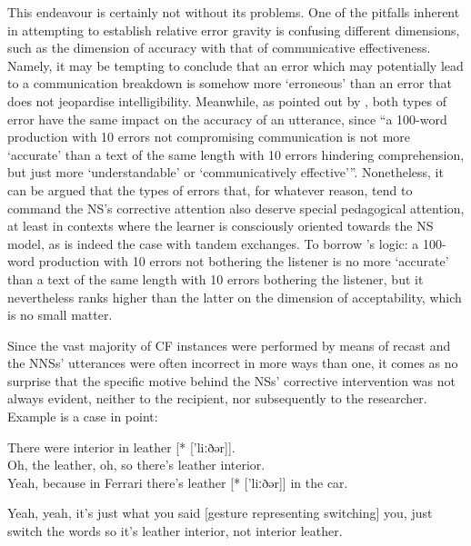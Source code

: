 \documentclass[output=paper,colorlinks,citecolor=brown,modfonts,nonflat]{../langscibook}
\begin{document}
This endeavour is certainly not without its problems. One of the pitfalls inherent in attempting to establish relative error gravity is confusing different dimensions, such as the dimension of accuracy with that of communicative effectiveness. Namely, it may be tempting to conclude that an error which may potentially lead to a communication breakdown is somehow more ‘erroneous’ than an error that does not jeopardise intelligibility. Meanwhile, as pointed out by \citet[592]{Pallotti2009}, both types of error have the same impact on the accuracy of an utterance, since “a 100-word production with 10 errors not compromising communication is not more ‘accurate’ than a text of the same length with 10 errors hindering comprehension, but just more ‘understandable’ or ‘communicatively effective’”. Nonetheless, it can be argued that the types of errors that, for whatever reason, tend to command the NS’s corrective attention also deserve special pedagogical attention, at least in contexts where the learner is consciously oriented towards the NS model, as is indeed the case with tandem exchanges. To borrow \citeauthor{Pallotti2009}’s logic: a 100-word production with 10 errors not bothering the listener is no more ‘accurate’ than a text of the same length with 10 errors bothering the listener, but it nevertheless ranks higher than the latter on the dimension of acceptability, which is no small matter.



Since the vast majority of CF instances were performed by means of recast and the NNSs’ utterances were often incorrect in more ways than one, it comes as no surprise that the specific motive behind the NSs’ corrective intervention was not always evident, neither to the recipient, nor subsequently to the researcher. Example  is a case in point: 


\ea\label{ex:scheuer:11}
{\NNS} {There} {were} {interior} {in} {leather} [* ['liːðər]].\\
{\NS} {Oh,} {the} {leather,} {oh,} {so} {there’s} {leather} {interior.}\\
{\NNS} {Yeah,} {because} {in} {Ferrari} {there’s} {leather} [* ['liːðər]] {in} {the} {car.}\\
{\NS} \parbox[t]{9cm}{{Yeah,} {yeah,} {it’s} {just} {what} {you} {said} [gesture representing switching] {you,} {just} {switch} {the} {words} {so} {it’s} {leather} {interior,} {not} {interior} {leather.}}
\z
\end{document}
